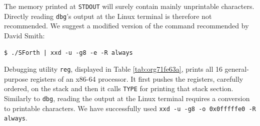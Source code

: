\documentclass[a4paper,12pt,final]{article}
\begin{document}
The memory printed at \texttt{STDOUT} will surely contain mainly unprintable
characters.  Directly reading \texttt{dbg}'s output at the Linux terminal is
therefore not recommended.  We suggest a modified version of the
command recommended by David Smith:

\begin{verbatim}
$ ./SForth | xxd -u -g8 -e -R always
\end{verbatim}

Debugging utility \texttt{reg}, displayed in Table \ref{tab:org71fe63a}, prints
all 16 general-purpose registers of an x86-64 processor.  It first
pushes the registers, carefully ordered, on the stack and then it
calls \texttt{TYPE} for printing that stack section.  Similarly to \texttt{dbg},
reading the output at the Linux terminal requires a conversion to
printable characters.  We have successfully used \texttt{xxd -u -g8 -o
0x0fffffe0 -R always}.
\end{document}
